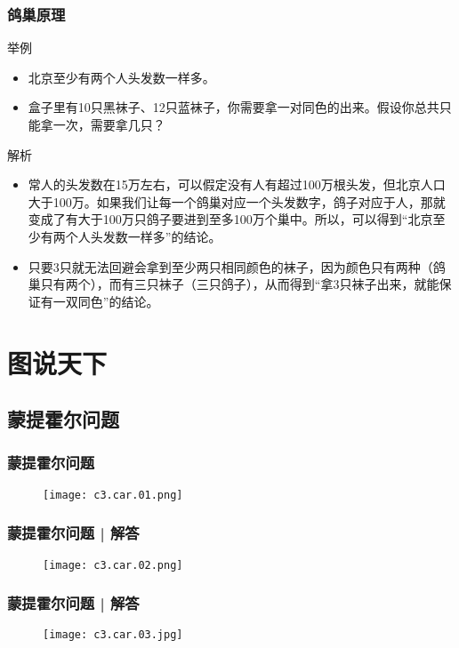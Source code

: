 \begin{frame}
  \frametitle{鸽巢原理}
  \begin{block}{举例}
    \begin{itemize}
      \item 北京至少有两个人头发数一样多。
      \item 盒子里有10只黑袜子、12只蓝袜子，你需要拿一对同色的出来。假设你总共只能拿一次，需要拿几只？
    \end{itemize}
  \end{block}
  \pause
  \begin{block}{解析}
    \begin{itemize}
      \item 常人的头发数在15万左右，可以假定没有人有超过100万根头发，但北京人口大于100万。如果我们让每一个鸽巢对应一个头发数字，鸽子对应于人，那就变成了有大于100万只鸽子要进到至多100万个巢中。所以，可以得到“北京至少有两个人头发数一样多”的结论。
      \item 只要3只就无法回避会拿到至少两只相同颜色的袜子，因为颜色只有两种（鸽巢只有两个），而有三只袜子（三只鸽子），从而得到“拿3只袜子出来，就能保证有一双同色”的结论。
    \end{itemize}
  \end{block}
\end{frame}

\section{图说天下}
\subsection{蒙提霍尔问题}
\begin{frame}
  \frametitle{蒙提霍尔问题}
  \begin{figure}
    \centering
    \texttt{[image: c3.car.01.png]}
  \end{figure}
\end{frame}

\begin{frame}
  \frametitle{蒙提霍尔问题 | 解答}
  \begin{figure}
    \centering
    \texttt{[image: c3.car.02.png]}
  \end{figure}
\end{frame}
\begin{frame}
  \frametitle{蒙提霍尔问题 | 解答}
  \begin{figure}
    \centering
    \texttt{[image: c3.car.03.jpg]}
  \end{figure}
\end{frame}


